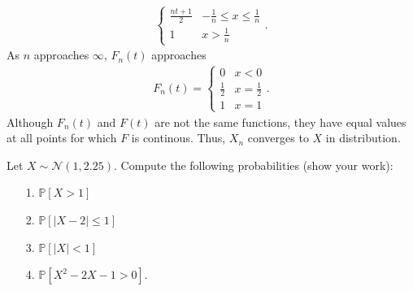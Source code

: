 \documentclass[a4paper]{article}
\begin{document}
\begin{Solution}
\begin{itemize}
\begin{align*}
\begin{cases}
					\frac{nt + 1}{2} & -\frac{1}{n} \le x \le \frac{1}{n} \\ 
					1 & x > \frac{1}{n}
				\end{cases}.
			\end{align*}
			As $n$ approaches $\infty$, $F_n(t)$ approaches
			\begin{align*}
				F_n(t) = \begin{cases}
					0 & x < 0 \\
					\frac{1}{2} & x = \frac{1}{2} \\
					1 & x = 1
				\end{cases}.
			\end{align*}
			Although $F_n(t)$ and $F(t)$ are not the same functions, they have equal values at all points for which $F$ is continous. Thus, $X_n$ converges to $X$ in distribution. 
	\end{itemize}
\end{Solution}
\begin{Exercise}
Let $X \sim \mathcal{N}(1, 2.25)$. Compute the following probabilities (show your work):
\begin{itemize}
	\item[1.] $\mathbb{P}[X > 1]$
	\item[2.] $\mathbb{P}[|X - 2| \le 1]$
	\item[3.] $\mathbb{P}[|X| < 1]$
	\item[4.] $\mathbb{P}[X^2 - 2X - 1 > 0]$.
\end{itemize}
\end{Exercise}
\end{document}
